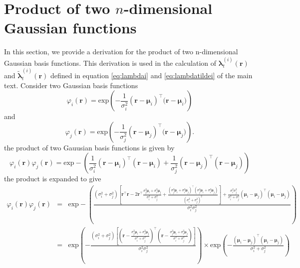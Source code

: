 \documentclass[]{article}
\begin{document}
\ifpdf
{}
\else
{}
\fi

\renewcommand{\theequation}{S1.\arabic{equation}}




\section*{Product of two $n$-dimensional Gaussian functions}\label{sec:GaussianProduct} 
In this section, we provide a derivation for the product of two n-dimensional Gaussian basis functions.
This derivation is used in the  calculation of $\boldsymbol\lambda_t^{(i)}\left(\mathbf r\right)$ and $\tilde{\boldsymbol\lambda}_t^{(i)}\left(\mathbf r\right)$ defined in equation \ref{eq:lambdai} and \ref{eq:lambdatildei} of the main text. Consider two
Gaussian basis functions
\begin{equation}\label{eq:n_dimensional_Gaussian1}
 \varphi_i(\mathbf r)=\mathrm{exp}\left({-\frac{1}{\sigma_i^2} (\mathbf r-\boldsymbol \mu_i)^\top(\mathbf r-\boldsymbol \mu_i})\right)
\end{equation}
and 
\begin{equation}\label{eq:n_dimensional_Gaussian2}
\varphi_j(\mathbf r)=\mathrm{exp}\left({-\frac{1}{\sigma_j^2} (\mathbf r-\boldsymbol \mu_j)^\top(\mathbf r-\boldsymbol \mu_j})\right).
\end{equation}
the product of two Gauusian basis functions is given by
\begin{equation}
 \varphi_i(\mathbf r)\varphi_j(\mathbf r)=\mathrm{exp}-\left({\frac{1}{\sigma_i^2} (\mathbf r-\boldsymbol \mu_i)^\top(\mathbf r-\boldsymbol\mu_i)+{\frac{1}{\sigma_j^2} (\mathbf r-\boldsymbol \mu_j)^\top(\mathbf r-\boldsymbol\mu_j)}}\right)
\end{equation}
the product is expanded to give
\begin{equation}
\begin{array}{ccc}
 
 \varphi_i(\mathbf r)\varphi_j(\mathbf r)&=&\mathrm{exp}-\left(\frac{(\sigma_i^2+\sigma_j^2)\left[\mathbf r^\top\mathbf r-2\mathbf r^\top \frac{\sigma_j^2\boldsymbol\mu_i+\sigma_i^2\boldsymbol\mu_j}{\sigma_i^2+\sigma_j^2}+\frac{(\sigma_j^2\boldsymbol\mu_i+\sigma_i^2\boldsymbol\mu_j)^\top(\sigma_j^2\boldsymbol\mu_i+\sigma_i^2\boldsymbol\mu_j)}{(\sigma_i^2+\sigma_j^2)^2}   \right]  +\frac{\sigma_i^2\sigma_j^2}{\sigma_i^2+\sigma_j^2}(\boldsymbol \mu_i-\boldsymbol\mu_j)^\top(\boldsymbol \mu_i-\boldsymbol\mu_j) }{\sigma_i^2\sigma_j^2}\right)\\
&=&\mathrm{exp}\left(-\frac{(\sigma_i^2+\sigma_j^2)\left[(\mathbf r-\frac{\sigma_j^2\boldsymbol\mu_i+\sigma_i^2\boldsymbol\mu_j}{\sigma_i^2+\sigma_j^2})^\top(\mathbf r-\frac{\sigma_j^2\boldsymbol\mu_i+\sigma_i^2\boldsymbol\mu_j}{\sigma_i^2+\sigma_j^2})\right]  }{\sigma_i^2\sigma_j^2}\right)
\times\mathrm{exp}\left(-\frac{(\boldsymbol \mu_i-\boldsymbol\mu_j)^\top(\boldsymbol \mu_i-\boldsymbol\mu_j)}{\sigma_i^2+\sigma_j^2}\right)
\end{array}
\end{equation}
\end{document}

